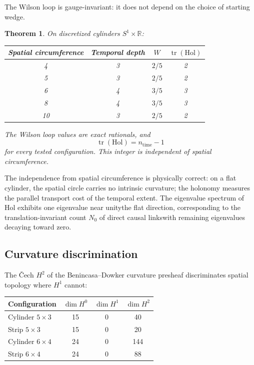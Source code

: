\documentclass[11pt,a4paper]{article}
\theoremstyle{plain}
\newtheorem{theorem}{Theorem}[section]
\theoremstyle{definition}
\theoremstyle{remark}
\newcommand{\Hol}{\mathrm{Hol}}
\newcommand{\R}{\mathbb{R}}
\begin{document}
The Wilson loop is gauge-invariant: it does not depend on the choice of starting wedge.

\begin{theorem}\label{thm:holonomy}
On discretized cylinders $S^1 \times \R$:

\medskip
\begin{center}
\begin{tabular}{cccc}
\toprule
Spatial circumference & Temporal depth & $W$ & $\operatorname{tr}(\Hol)$ \\
\midrule
4  & 3 & $2/5$ & 2 \\
5  & 3 & $2/5$ & 2 \\
6  & 4 & $3/5$ & 3 \\
8  & 4 & $3/5$ & 3 \\
10 & 3 & $2/5$ & 2 \\
\bottomrule
\end{tabular}
\end{center}
\medskip

\noindent The Wilson loop values are exact rationals, and
\[
\operatorname{tr}(\Hol) = n_{\mathrm{time}} - 1
\]
for every tested configuration.
This integer is independent of spatial circumference.
\end{theorem}

The independence from spatial circumference is physically correct: on a flat cylinder, the spatial circle carries no intrinsic curvature; the holonomy measures the parallel transport cost of the temporal extent.
The eigenvalue spectrum of $\Hol$ exhibits one eigenvalue near unity\textemdash the flat direction, corresponding to the translation-invariant count $N_0$ of direct causal links\textemdash with remaining eigenvalues decaying toward zero.


\subsection{Curvature discrimination}

The \v{C}ech $H^2$ of the Benincasa--Dowker curvature presheaf discriminates spatial topology where $H^1$ cannot:

\medskip
\begin{center}
\begin{tabular}{lccc}
\toprule
Configuration & $\dim H^0$ & $\dim H^1$ & $\dim H^2$ \\
\midrule
Cylinder $5 \times 3$ & 15 & 0 & 40 \\
Strip $5 \times 3$    & 15 & 0 & 20 \\[2pt]
Cylinder $6 \times 4$ & 24 & 0 & 144 \\
Strip $6 \times 4$    & 24 & 0 & 88 \\
\bottomrule
\end{tabular}
\end{center}
\medskip
\end{document}
